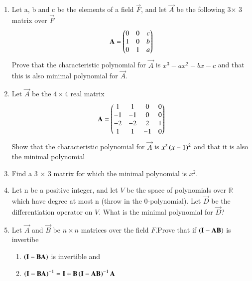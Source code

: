 \renewcommand{\theequation}{\theenumi}
\renewcommand{\thefigure}{\theenumi}
\begin{enumerate}[label=\thesubsection.\arabic*.,ref=\thesubsection.\theenumi]


\item Let a, b and c be the elements of a field $\vec{F}$, and let $\vec{A}$ be the following 3$\times$ 3 matrix over $\vec{F}$
\begin{align}
\mathbf{A} = \begin{pmatrix}0&0&c\\1&0&b\\0&1&a\end{pmatrix}
\label{eq:solutions/6/3/2/Q}
\end{align}
Prove that the characteristic polynomial for $\vec{A}$ is $x^3-ax^2-bx-c$ and that this is also minimal polynomial for $\vec{A}$.
%
\solution

\item %
Let $\Vec{A}$ be the $4\times 4$ real matrix
\begin{align}
    \Vec{A}=\myvec{1&1&0&0\\-1&-1&0&0\\-2&-2&2&1\\1&1&-1&0}
\end{align}
Show that the characteristic polynomial for $\Vec{A}$ is $x^2\left(x-1\right)^2$ and that it is also the minimal polynomial
%
\\
%
\solution

\twocolumn
\item Find a 3 $\times$ 3 matrix for which the minimal polynomial is $x^2$.
%
\\
%
\solution

\item  Let n be a positive integer, and let $V$ be the space of polynomials over $\mathbb{R}$ which have degree at most n (throw in
the 0-polynomial). Let $\vec{D}$ be the differentiation operator on $V$. What is the minimal polynomial for $\vec{D}$?
%
\\
%
\solution

\item Let $\vec{A}$ and $\vec{B}$ be $n\times n$ matrices over the 
field $F$.Prove that if $\left(\mathbf{I}-\mathbf{A}\mathbf{B}\right)$ is invertibe
\begin{enumerate}
    \item $\left(\mathbf{I}-\mathbf{B}\mathbf{A}\right)$ is invertible and
    \item $\left(\mathbf{I}-\mathbf{B}\mathbf{A}\right)^{-1}=\mathbf{I}+\mathbf{B}\left(\mathbf{I}-\mathbf{A}\mathbf{B}\right)^{-1}\mathbf{A}$
\end{enumerate}

\end{enumerate}
